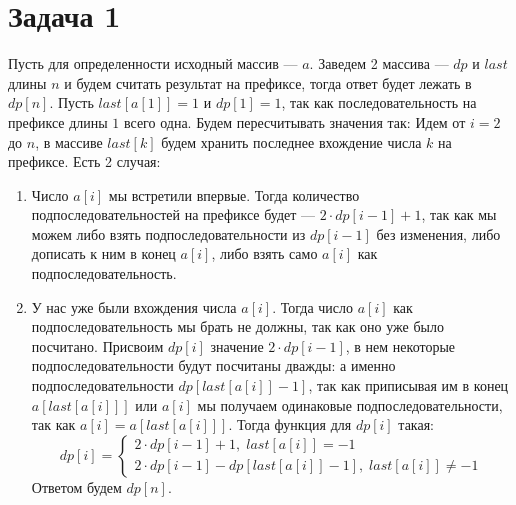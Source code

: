 \documentclass{article}
\begin{document}
 
\noindent 
\large 
\onehalfspacing  
\section{Задача 1}
Пусть для определенности исходный массив --- $a$. Заведем 2 массива --- $dp$ и $last$ длины $n$ и будем считать результат на префиксе, тогда ответ будет лежать в $dp[n]$. Пусть $last[a[1]]=1$ и $dp[1] = 1$, так как последовательность на префиксе длины $1$ всего одна. Будем пересчитывать значения так:\newline
Идем от $i = 2$ до $n$, в массиве $last[k]$ будем хранить последнее вхождение числа $k$ на префиксе.\newline
Есть 2 случая:\newline
\begin{enumerate}
\item Число $a[i]$ мы встретили впервые. Тогда количество подпоследовательностей на префиксе будет --- $2\cdot dp[i-1] + 1$, так как мы можем либо взять подпоследовательности из $dp[i-1]$ без изменения, либо дописать к ним в конец $a[i]$, либо взять само $a[i]$ как подпоследовательность.
\item У нас уже были вхождения числа $a[i]$. Тогда число $a[i]$ как подпоследовательность мы брать не должны, так как оно уже было посчитано. Присвоим $dp[i]$ значение $2\cdot dp[i-1]$, в нем некоторые подпоследовательности будут посчитаны дважды: а именно подпоследовательности $dp[last[a[i]] - 1]$, так как приписывая им в конец $a[last[a[i]]]$ или $a[i]$ мы получаем одинаковые подпоследовательности, так как $a[i] = a[last[a[i]]]$. Тогда функция для $dp[i]$ такая:\newline
\begin{equation*}
dp[i] =
\begin{cases}
2\cdot dp[i - 1] + 1,\; last[a[i]] = -1\\
2\cdot dp[i - 1] - dp[last[a[i]] - 1],\; last[a[i]] \neq -1
\end{cases}
\end{equation*}
Ответом будем $dp[n]$.
\end{enumerate}
\end{document}
